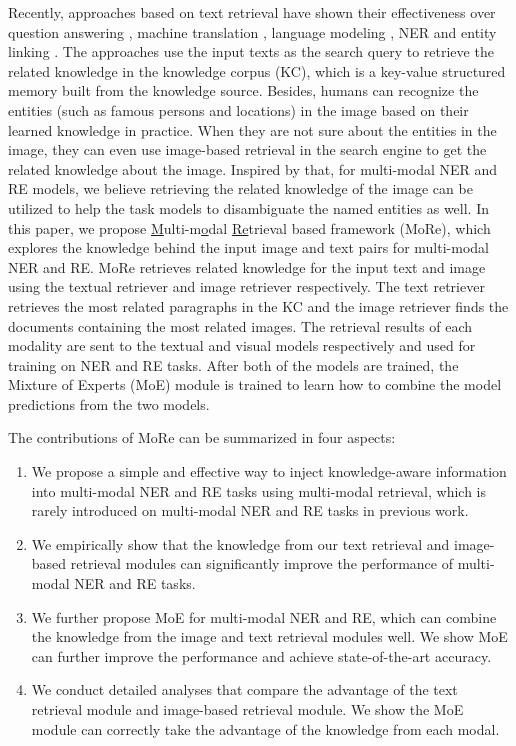 \documentclass[11pt]{article}
\begin{document}
Recently, approaches based on text retrieval have shown their effectiveness over question answering \citep{liu2020k,xu2021human,wang-etal-2022-training}, machine translation \citep{gu2018search,zhang-etal-2018-guiding,xu-etal-2020-boosting}, language modeling \citep{guu2020realm,DBLP:journals/corr/abs-2112-04426}, NER \citep{wang-etal-2021-improving,wang-etal-2022-damo,zhang-etal-2022-domain} and entity linking \citep{zhang-etal-2022-iclr,huang-etal-2022-nlpcc}. The approaches use the input texts as the search query to retrieve the related knowledge in the knowledge corpus (KC), which is a key-value structured memory built from the knowledge source. Besides, humans can recognize the entities (such as famous persons and locations) in the image based on their learned knowledge in practice. When they are not sure about the entities in the image, they can even use image-based retrieval in the search engine to get the related knowledge about the image. Inspired by that, for multi-modal NER and RE models, we believe retrieving the related knowledge of the image can be utilized to help the task models to disambiguate the named entities as well. In this paper, we propose \underline{M}ulti-m\underline{o}dal \underline{Re}trieval based framework (MoRe), which explores the knowledge behind the input image and text pairs for multi-modal NER and RE. MoRe retrieves related knowledge for the input text and image using the textual retriever and image retriever respectively. The text retriever retrieves the most related paragraphs in the KC and the image retriever finds the documents containing the most related images. The retrieval results of each modality are sent to the textual and visual models respectively and used for training on NER and RE tasks. After both of the models are trained, the Mixture of Experts (MoE) module is trained to learn how to combine the model predictions from the two models. 

The contributions of MoRe can be summarized in four aspects:
\begin{enumerate}[leftmargin=*]
    \item We propose a simple and effective way to inject knowledge-aware information into multi-modal NER and RE tasks using multi-modal retrieval, which is rarely introduced on multi-modal NER and RE tasks in previous work.
    \item We empirically show that the knowledge from our text retrieval and image-based retrieval modules can significantly improve the performance of multi-modal NER and RE tasks. 
    \item We further propose MoE for multi-modal NER and RE, which can combine the knowledge from the image and text retrieval modules well. We show MoE can further improve the performance and achieve state-of-the-art accuracy.
    \item We conduct detailed analyses that compare the advantage of the text retrieval module and image-based retrieval module. We show the MoE module can correctly take the advantage of the knowledge from each modal.
\end{enumerate}
\end{document}

